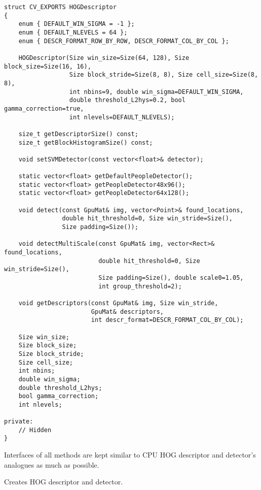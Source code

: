 \begin{lstlisting}
struct CV_EXPORTS HOGDescriptor
{
    enum { DEFAULT_WIN_SIGMA = -1 };
    enum { DEFAULT_NLEVELS = 64 };
    enum { DESCR_FORMAT_ROW_BY_ROW, DESCR_FORMAT_COL_BY_COL };

    HOGDescriptor(Size win_size=Size(64, 128), Size block_size=Size(16, 16),
                  Size block_stride=Size(8, 8), Size cell_size=Size(8, 8),
                  int nbins=9, double win_sigma=DEFAULT_WIN_SIGMA,
                  double threshold_L2hys=0.2, bool gamma_correction=true,
                  int nlevels=DEFAULT_NLEVELS);

    size_t getDescriptorSize() const;
    size_t getBlockHistogramSize() const;

    void setSVMDetector(const vector<float>& detector);

    static vector<float> getDefaultPeopleDetector();
    static vector<float> getPeopleDetector48x96();
    static vector<float> getPeopleDetector64x128();

    void detect(const GpuMat& img, vector<Point>& found_locations, 
                double hit_threshold=0, Size win_stride=Size(), 
                Size padding=Size());

    void detectMultiScale(const GpuMat& img, vector<Rect>& found_locations,
                          double hit_threshold=0, Size win_stride=Size(), 
                          Size padding=Size(), double scale0=1.05, 
                          int group_threshold=2);

    void getDescriptors(const GpuMat& img, Size win_stride, 
                        GpuMat& descriptors,
                        int descr_format=DESCR_FORMAT_COL_BY_COL);

    Size win_size;
    Size block_size;
    Size block_stride;
    Size cell_size;
    int nbins;
    double win_sigma;
    double threshold_L2hys;
    bool gamma_correction;
    int nlevels;

private:
    // Hidden
}
\end{lstlisting}

Interfaces of all methods are kept similar to CPU HOG descriptor and detector's analogues as much as possible.


Creates HOG descriptor and detector.


